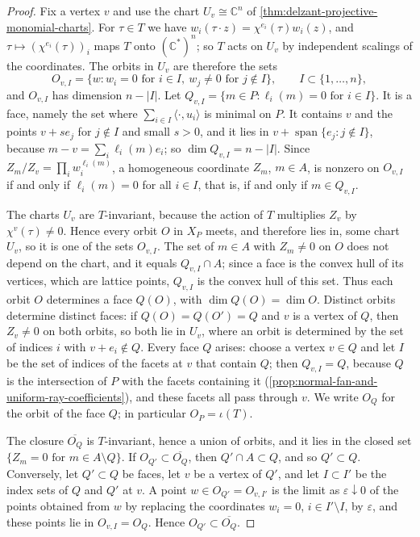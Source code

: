 \begin{proof}
Fix a vertex $v$ and use the chart $U_v\cong\mathbb C^n$ of \cref{thm:delzant-projective-monomial-charts}. For $\tau\in T$ we have $w_i(\tau\cdot z)=\chi^{e_i}(\tau)w_i(z)$, and $\tau\mapsto(\chi^{e_i}(\tau))_i$ maps $T$ onto $(\mathbb C^*)^n$; so $T$ acts on $U_v$ by independent scalings of the coordinates. The orbits in $U_v$ are therefore the sets
\[
 O_{v,I}=\{w:w_i=0\text{ for }i\in I,\ w_j\neq0\text{ for }j\notin I\},\qquad I\subset\{1,\ldots,n\},
\]
and $O_{v,I}$ has dimension $n-|I|$. Let $Q_{v,I}=\{m\in P:\ell_i(m)=0\text{ for }i\in I\}$. It is a face, namely the set where $\sum_{i\in I}\langle\cdot,u_i\rangle$ is minimal on $P$. It contains $v$ and the points $v+se_j$ for $j\notin I$ and small $s>0$, and it lies in $v+\operatorname{span}\{e_j:j\notin I\}$, because $m-v=\sum_i\ell_i(m)e_i$; so $\dim Q_{v,I}=n-|I|$. Since $Z_m/Z_v=\prod_iw_i^{\ell_i(m)}$, a homogeneous coordinate $Z_m$, $m\in A$, is nonzero on $O_{v,I}$ if and only if $\ell_i(m)=0$ for all $i\in I$, that is, if and only if $m\in Q_{v,I}$.

The charts $U_v$ are $T$-invariant, because the action of $T$ multiplies $Z_v$ by $\chi^v(\tau)\neq0$. Hence every orbit $O$ in $X_P$ meets, and therefore lies in, some chart $U_v$, so it is one of the sets $O_{v,I}$. The set of $m\in A$ with $Z_m\neq0$ on $O$ does not depend on the chart, and it equals $Q_{v,I}\cap A$; since a face is the convex hull of its vertices, which are lattice points, $Q_{v,I}$ is the convex hull of this set. Thus each orbit $O$ determines a face $Q(O)$, with $\dim Q(O)=\dim O$. Distinct orbits determine distinct faces: if $Q(O)=Q(O')=Q$ and $v$ is a vertex of $Q$, then $Z_v\neq0$ on both orbits, so both lie in $U_v$, where an orbit is determined by the set of indices $i$ with $v+e_i\notin Q$. Every face $Q$ arises: choose a vertex $v\in Q$ and let $I$ be the set of indices of the facets at $v$ that contain $Q$; then $Q_{v,I}=Q$, because $Q$ is the intersection of $P$ with the facets containing it (\cref{prop:normal-fan-and-uniform-ray-coefficients}), and these facets all pass through $v$. We write $O_Q$ for the orbit of the face $Q$; in particular $O_P=\iota(T)$.

The closure $\overline{O_Q}$ is $T$-invariant, hence a union of orbits, and it lies in the closed set $\{Z_m=0\text{ for }m\in A\setminus Q\}$. If $O_{Q'}\subset\overline{O_Q}$, then $Q'\cap A\subset Q$, and so $Q'\subset Q$. Conversely, let $Q'\subset Q$ be faces, let $v$ be a vertex of $Q'$, and let $I\subset I'$ be the index sets of $Q$ and $Q'$ at $v$. A point $w\in O_{Q'}=O_{v,I'}$ is the limit as $\varepsilon\downarrow0$ of the points obtained from $w$ by replacing the coordinates $w_i=0$, $i\in I'\setminus I$, by $\varepsilon$, and these points lie in $O_{v,I}=O_Q$. Hence $O_{Q'}\subset\overline{O_Q}$.


\end{proof}
